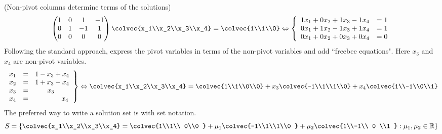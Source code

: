 \begin{example} (Non-pivot columns determine terms of the solutions)
\[\begin{pmatrix}
1 &  0 & 1 & -1 \\ 
 0 & 1 & -1& 1  \\
 0 &0   & 0  & 0 \\
\end{pmatrix}
\colvec{x_1\\x_2\\x_3\\x_4} 
=
\colvec{1\\1\\0} 
\Leftrightarrow
\left\{
\begin{array}{lcr}
	1x_1 +0x_2+ 1x_3 - 1x_4 & = 1 \\
	0x_1 +1x_2 - 1x_3 + 1x_4 & = 1 \\
	0x_1 +0x_2 + 0x_3 + 0x_4 & = 0 
\end{array}
     \right.
\]
Following the standard approach, express the pivot variables in terms of the non-pivot variables and add ``freebee equations". Here $x_3$ and $x_4$ are non-pivot variables.  
\begin{eqnarray*}
\left.
\begin{array}{rcl}
	x_1 & = &1 -x_3+x_4 \\
	x_2 & = &1 +x_3-x_4 \\
	x_3 & = &\phantom{1+~\,}x_3\\
	x_4 & =&\phantom{1+x_3+~}x_4         
\end{array}
     \right\}
     \Leftrightarrow
\colvec{x_1\\x_2\\x_3\\x_4} 
= \colvec{1\\1\\0\\0} + x_3\colvec{-1\\1\\1\\0} + x_4\colvec{1\\-1\\0\\1}
\end{eqnarray*}
The preferred way to write a solution set is with set notation.  \[S = \left\{\colvec{x_1\\x_2\\x_3\\x_4} = \colvec{1\\1\\ 0\\0 } + \mu_1 \colvec{-1\\1\\1\\0 }  + \mu_2  \colvec{1\\-1\\ 0 \\1 } : \mu_1,\mu_2\in  {\mathbb R} \right\} \]

\end{example}
